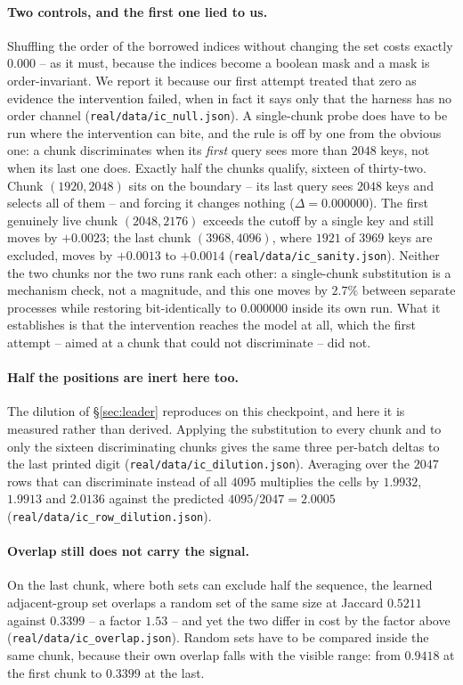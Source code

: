 \documentclass[10pt]{article}
\begin{document}
\paragraph{Two controls, and the first one lied to us.} Shuffling the order of
the borrowed indices without changing the set costs exactly $0.000$ -- as it
must, because the indices become a boolean mask and a mask is order-invariant.
We report it because our first attempt treated that zero as evidence the
intervention failed, when in fact it says only that the harness has no order
channel (\texttt{real/data/ic\_null.json}). A single-chunk probe does have to be
run where the intervention can bite, and the rule is off by one from the obvious
one: a chunk discriminates when its \emph{first} query sees more than $2048$
keys, not when its last one does. Exactly half the chunks qualify, sixteen of
thirty-two. Chunk $(1920,2048)$ sits on the boundary -- its last query sees
$2048$ keys and selects all of them -- and forcing it changes nothing
($\Delta = 0.000000$). The first genuinely live chunk $(2048,2176)$ exceeds the
cutoff by a single key and still moves by $+0.0023$; the last chunk
$(3968,4096)$, where $1921$ of $3969$ keys are excluded, moves by
$+0.0013$ to $+0.0014$
(\texttt{real/data/ic\_sanity.json}). Neither the two chunks nor the two runs
rank each other: a single-chunk substitution is a mechanism check, not a
magnitude, and this one moves by $2.7\%$ between separate processes while
restoring bit-identically to $0.000000$ inside its own run. What it establishes
is that the intervention reaches the model at all, which the first attempt --
aimed at a chunk that could not discriminate -- did not.

\paragraph{Half the positions are inert here too.} The dilution of
\S\ref{sec:leader} reproduces on this checkpoint, and here it is measured rather
than derived. Applying the substitution to every chunk and to only the sixteen
discriminating chunks gives the same three per-batch deltas to the last printed
digit (\texttt{real/data/ic\_dilution.json}). Averaging over the $2047$ rows that
can discriminate instead of all $4095$ multiplies the cells by
$1.9932$, $1.9913$ and $2.0136$ against the predicted $4095/2047 = 2.0005$
(\texttt{real/data/ic\_row\_dilution.json}).

\paragraph{Overlap still does not carry the signal.} On the last chunk, where
both sets can exclude half the sequence, the learned adjacent-group set overlaps
a random set of the same size at Jaccard $0.5211$ against $0.3399$ -- a factor
$1.53$ -- and yet the two differ in cost by the factor above
(\texttt{real/data/ic\_overlap.json}). Random sets have to be compared inside
the same chunk, because their own overlap falls with the visible range: from
$0.9418$ at the first chunk to $0.3399$ at the last.
\end{document}
